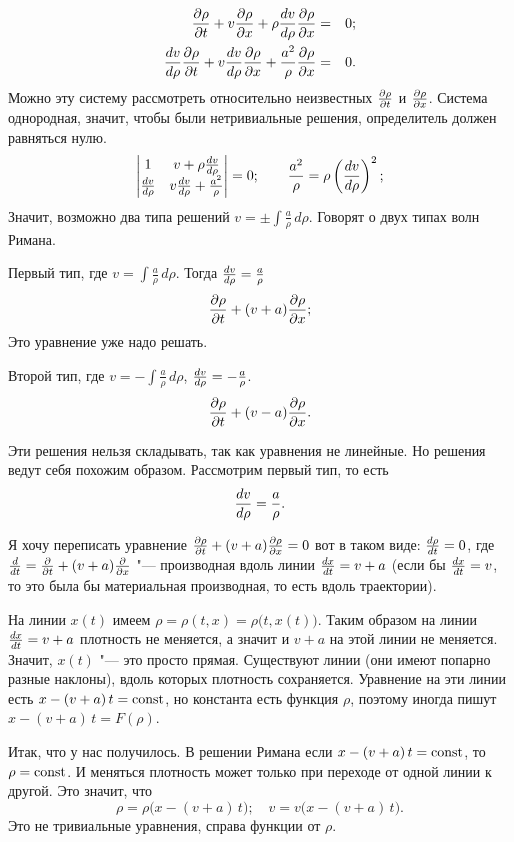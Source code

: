 \begin{eqnarray*}
  \frac{\partial \rho}{\partial t} + v\frac{\partial \rho}{\partial x} + \rho\frac{dv}{d\rho}\frac{\partial \rho}{\partial x}&=&0;\\
  \frac{dv}{d\rho} \frac{\partial \rho}{\partial t} + v\frac{dv}{d\rho}\frac{\partial \rho}{\partial x} + \frac{a^2}\rho\frac{\partial \rho}{\partial x}&=&0.
\end{eqnarray*}
Можно эту систему рассмотреть относительно неизвестных $\frac{\partial \rho}{\partial t}$ и $\frac{\partial \rho}{\partial x}$. Система однородная, значит, чтобы были нетривиальные решения, определитель должен равняться нулю.
\[
  \begin{vmatrix}
    1 & v + \rho\frac{dv}{d\rho}\\
  \frac{dv}{d\rho} & v\frac{dv}{d\rho} + \frac{a^2}{\rho}
\end{vmatrix}=0;\qquad \frac{a^2}\rho = \rho\left(\frac{dv}{d\rho}\right)^2;
\]
Значит, возможно два типа решений $v = \pm\int\frac a\rho\,d\rho$. Говорят о двух типах волн Римана.
\begin{roItems}
\item Первый тип, где $v = \int\frac a\rho\,d\rho$. Тогда $\frac{dv}{d\rho} =\frac a\rho$
\[
  \frac{\partial \rho}{\partial t} + (v+a)\frac{\partial \rho}{\partial x};
\]
Это уравнение уже надо решать.
\item Второй тип, где $v = -\int\frac{a}{\rho}\,d\rho$, $\frac{dv}{d\rho} =-\frac a\rho$.
\[
  \frac{\partial \rho}{\partial t} + (v-a)\frac{\partial \rho}{\partial x}.
\]
\end{roItems}

Эти решения нельзя складывать, так как уравнения не линейные. Но решения ведут себя похожим образом. Рассмотрим первый тип, то есть
\[
  \frac{dv}{d\rho} = \frac{a}{\rho}.
\]

Я хочу переписать уравнение $\frac{\partial \rho}{\partial t} + (v+a)\frac{\partial \rho}{\partial x}=0$ вот в таком виде: $\frac{d\rho}{dt}=0$, где $\frac{d}{dt} = \frac{\partial  }{\partial t} + (v+a)\frac{\partial  }{\partial x}$ "--- производная вдоль линии $\frac{dx}{dt} = v+a$ (если бы $\frac{dx}{dt} = v$, то это была бы материальная производная, то есть вдоль траектории).

На линии $x(t)$ имеем $\rho=\rho(t,x) = \rho\big(t,x(t)\big)$. Таким образом на линии $\frac{dx}{dt}= v+a$ плотность не меняется, а значит и $v+a$ на этой линии не меняется. Значит, $x(t)$ "--- это просто прямая. Существуют линии (они имеют попарно разные наклоны), вдоль которых плотность сохраняется. Уравнение на эти линии есть $x - (v+a)\,t =\operatorname{const}$, но константа есть функция $\rho$, поэтому иногда пишут $x-(v+a)\,t = F(\rho)$.

Итак, что у нас получилось. В решении Римана если $x-(v+a)\,t = \operatorname{const}$, то $\rho = \operatorname{const}$. И меняться плотность может только при переходе от одной линии к другой. Это значит, что
\[
  \rho = \rho\big(x-(v+a)\,t\big);\quad v = v\big(x - (v+a)\,t\big).
\]
Это не тривиальные уравнения, справа функции от $\rho$.

